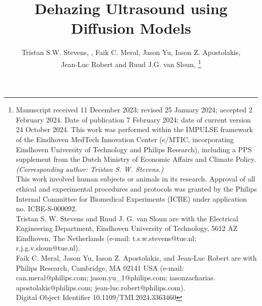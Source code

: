 \documentclass[journal,twoside,web]{ieeecolor}
\begin{document}
\title{Dehazing Ultrasound using Diffusion Models}
\author{Tristan S.W. Stevens, , Faik C. Meral, Jason Yu, Iason Z. Apostolakis,\\Jean-Luc Robert and Ruud J.G. van Sloun, 
\thanks{
Manuscript received 11 December 2023; revised 25 January 2024;
accepted 2 February 2024. Date of publication 7 February 2024; date
of current version 24 October 2024. This work was performed within the IMPULSE framework of the Eindhoven MedTech Innovation Center (e/MTIC, incorporating Eindhoven University of Technology and Philips Research), including a PPS supplement from the Dutch Ministry of Economic Affairs and Climate Policy.\\
\emph{(Corresponding author: Tristan S. W. Stevens.)}\\
\indent This work involved human subjects or animals in its research. Approval
of all ethical and experimental procedures and protocols was granted by
the Philips Internal Committee for Biomedical Experiments (ICBE) under
application no. ICBE-S-000092.\\
\indent Tristan S. W. Stevens and Ruud J. G. van Sloun are with the Electrical Engineering Department, Eindhoven University of Technology,
5612 AZ Eindhoven, The Netherlands (e-mail: t.s.w.stevens@tue.nl;
r.j.g.v.sloun@tue.nl).\\
\indent Faik C. Meral, Jason Yu, Iason Z. Apostolakis, and Jean-Luc Robert are with Philips Research, Cambridge, MA 02141 USA (e-mail: can.meral@philips.com; jason.yu\_1@philips.com; iasonzacharias.
apostolakis@philips.com; jean-luc.robert@philips.com).\\
\indent Digital Object Identifier 10.1109/TMI.2024.3363460}
}


\maketitle
\end{document}
